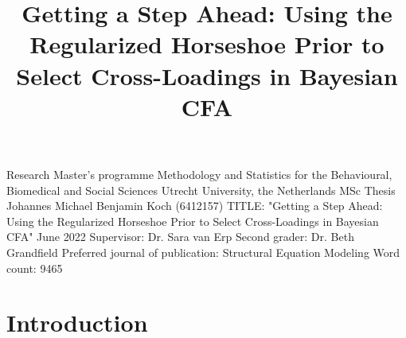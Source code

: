 \documentclass[
  man, donotrepeattitle,floatsintext]{apa6}
\title{Getting a Step Ahead: Using the Regularized Horseshoe Prior to Select Cross-Loadings in Bayesian CFA}
\author{\phantom{0}}
\date{}
\affiliation{\phantom{0}}
\begin{document}
\maketitle

\thispagestyle{empty}

\begin{large}
\noindent Research Master's programme 
Methodology and Statistics for the Behavioural, Biomedical and Social Sciences \newline
Utrecht University, the Netherlands \newline
\newline
\newline
\newline
\newline
MSc Thesis Johannes Michael Benjamin Koch (6412157) 
\newline
TITLE: "Getting a Step Ahead: Using the Regularized Horseshoe Prior to Select Cross-Loadings in Bayesian CFA"
\newline
June 2022 
\newline
\newline
\newline
\newline
\newline
Supervisor:\newline
Dr. Sara van Erp \newline
\newline
\newline
Second grader: \newline
Dr. Beth Grandfield
\newline
\newline
\newline
\newline
Preferred journal of publication: Structural Equation Modeling
\newline
Word count: 9465
\newline
\end{large}
\addtocounter{page}{-1}
\clearpage
\pagebreak

\clearpage

\hypertarget{introduction}{%
\section{Introduction}\label{introduction}}
\end{document}

